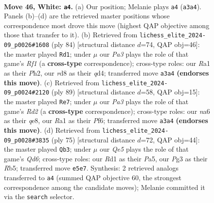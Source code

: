 \documentclass[11pt]{article}
\begin{document}
\clearpage

\begin{figure}[p]\centering
\begin{subfigure}{0.46\textwidth}\centering
\resizebox{\linewidth}{!}{%
\newchessgame
\chessboard[
  setfen={3r2k1/pp6/n2P4/4Qp1q/2p5/P5P1/1P6/R2R1K2 w - - 0 46},
  showmover=false,
  pgfstyle=straightmove, color=movearrow, markmove={a3-a4}
]}
\caption{}
\end{subfigure}\hfill
\begin{subfigure}{0.46\textwidth}\centering
\resizebox{\linewidth}{!}{%
\newchessgame
\chessboard[
  setfen={5r1k/5P1p/6p1/3pp3/3q2P1/8/4Q2P/5R1K w - - 0 43},
  showmover=false,
  pgfstyle=straightmove, color=movearrow, markmove={f1-d1}
]}
\caption{}
\end{subfigure}
\\[4pt]
\begin{subfigure}{0.46\textwidth}\centering
\resizebox{\linewidth}{!}{%
\newchessgame
\chessboard[
  setfen={4Q3/1p1r3p/1P2kp2/8/4p2P/3q2P1/5P2/4R1K1 b - - 6 45},
  showmover=false,
  pgfstyle=straightmove, color=movearrow, markmove={d7-e7}
]}
\caption{}
\end{subfigure}\hfill
\begin{subfigure}{0.46\textwidth}\centering
\resizebox{\linewidth}{!}{%
\newchessgame
\chessboard[
  setfen={8/1kp4R/8/pr2pN2/4P3/3q4/Q5PK/8 b - - 2 38},
  showmover=false,
  pgfstyle=straightmove, color=movearrow, markmove={d3-b3}
]}
\caption{}
\end{subfigure}
\caption{\textbf{Move 46, White: \texttt{a4}.} (a) Our position; Melanie plays \texttt{a4} (\texttt{a3a4}). Panels (b)--(d) are the retrieved master positions whose correspondence most drove this move (highest QAP objective among those that transfer to it). (b) Retrieved from \texttt{lichess\_elite\_2024-09\_p0026\#1608} (ply 84) [structural distance $d$=74, QAP obj=46]: the master played \texttt{Rd1}; under $\mu$ our \emph{Pa3} plays the role of that game's \emph{Rf1} (a \textbf{cross-type} correspondence); cross-type roles: our \emph{R}a1 as their \emph{P}h2, our \emph{r}d8 as their \emph{q}d4; transferred move \texttt{a3a4} \textbf{(endorses this move)}. (c) Retrieved from \texttt{lichess\_elite\_2024-09\_p0024\#2120} (ply 89) [structural distance $d$=58, QAP obj=15]: the master played \texttt{Re7}; under $\mu$ our \emph{Pa3} plays the role of that game's \emph{Rd2} (a \textbf{cross-type} correspondence); cross-type roles: our \emph{n}a6 as their \emph{q}e8, our \emph{R}a1 as their \emph{P}f6; transferred move \texttt{a3a4} \textbf{(endorses this move)}. (d) Retrieved from \texttt{lichess\_elite\_2024-09\_p0028\#3835} (ply 75) [structural distance $d$=72, QAP obj=44]: the master played \texttt{Qb3}; under $\mu$ our \emph{Qe5} plays the role of that game's \emph{Qd6}; cross-type roles: our \emph{R}d1 as their \emph{P}a5, our \emph{P}g3 as their \emph{R}b5; transferred move \texttt{e5e7}. Synthesis: 2 retrieved analogs transferred to \texttt{a4} (summed QAP objective 60, the strongest correspondence among the candidate moves); Melanie committed it via the \texttt{search} selector.}
\label{fig:thought-m90}
\end{figure}
\end{document}
